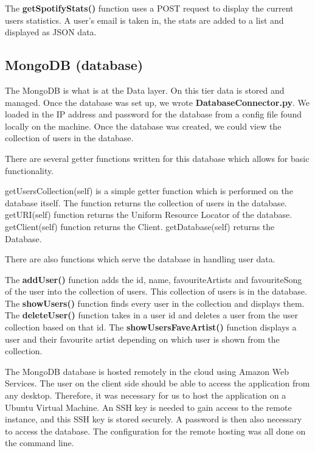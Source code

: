 The \textbf{getSpotifyStats()} function uses a POST request to display the current users statistics. A user’s email is taken in, the stats are added to a list and displayed as JSON data.\newline


\subsection{MongoDB (database)}
The MongoDB is what is at the Data layer. On this tier data is stored and managed. Once the database was set up, we wrote \textbf{DatabaseConnector.py}. We loaded in the IP address and password for the database from a config file found locally on the machine. Once the database was created, we could view the collection of users in the database.\newline

There are several getter functions written for this database which allows for basic functionality.

getUsersCollection(self) is a simple getter function which is performed on the database itself. The function returns the collection of users in the database.
getURI(self) function returns the Uniform Resource Locator of the database.
getClient(self) function returns the Client.
getDatabase(self) returns the Database.\newline

There are also functions which serve the database in handling user data.\newline

The \textbf{addUser()} function adds the id, name, favouriteArtists and favouriteSong of the user into the collection of users. This collection of users is in the database.\newline
The \textbf{showUsers()} function finds every user in the collection and displays them.\newline
The \textbf{deleteUser()} function takes in a user id and deletes a user from the user collection based on that id.\newline
The \textbf{showUsersFaveArtist()} function displays a user and their favourite artist depending on which user is shown from the collection.\newline

The MongoDB database is hosted remotely in the cloud using Amazon Web Services. The user on the client side should be able to access the application from any desktop. Therefore, it was necessary for us to host the application on a Ubuntu Virtual Machine. An SSH key is needed to gain access to the remote instance, and this SSH key is stored securely. A password is then also necessary to access the database. The configuration for the remote hosting was all done on the command line.\newline



